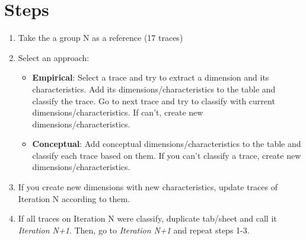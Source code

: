 \section{Steps}

\begin{enumerate}
	\item
	Take the a group N as a reference (17 traces)
	\item
	Select an approach:
	
	\begin{itemize}
		\item
		\textbf{Empirical}: Select a trace and try to extract a
		dimension and its characteristics. Add its
		dimensions/characteristics to the table and classify the trace. Go
		to next trace and try to classify with current
		dimensions/characteristics. If can't, create new
		dimensions/characteristics.
		\item
		\textbf{Conceptual}: Add conceptual dimensions/characteristics to the table
		and classify each trace based on them. If you can't classify a
		trace, create new dimensions/characteristics.
	\end{itemize}
	\item
	If you create new dimensions with new characteristics, update traces
	of Iteration N according to them.
	\item
	If all traces on Iteration N were classify, duplicate tab/sheet and
	call it \emph{Iteration N+1}. Then, go to \emph{Iteration N+1} and
	repeat steps 1-3.
\end{enumerate}
